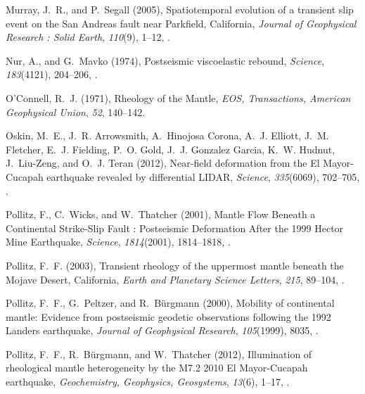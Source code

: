 \documentclass[draft,linenumbers]{AGUJournal}
\begin{document}
\begin{thebibliography}{52}
Murray, J.~R., and P.~Segall (2005), {Spatiotemporal evolution of a transient
  slip event on the San Andreas fault near Parkfield, California},
  \textit{Journal of Geophysical Research : Solid Earth}, \textit{110}(9),
  1--12, .

Nur, A., and G.~Mavko (1974), {Postseismic viscoelastic rebound},
  \textit{Science}, \textit{183}(4121), 204--206, .

O'Connell, R.~J. (1971), {Rheology of the Mantle}, \textit{EOS, Transactions,
  American Geophysical Union}, \textit{52}, 140--142.

Oskin, M.~E., J.~R. Arrowsmith, A.~{Hinojosa Corona}, A.~J. Elliott, J.~M.
  Fletcher, E.~J. Fielding, P.~O. Gold, J.~J. {Gonzalez Garcia}, K.~W. Hudnut,
  J.~Liu-Zeng, and O.~J. Teran (2012), {Near-field deformation from the El
  Mayor-Cucapah earthquake revealed by differential LIDAR}, \textit{Science},
  \textit{335}(6069), 702--705, .

Pollitz, F., C.~Wicks, and W.~Thatcher (2001), {Mantle Flow Beneath a
  Continental Strike-Slip Fault : Postseismic Deformation After the 1999 Hector
  Mine Earthquake}, \textit{Science}, \textit{1814}(2001), 1814--1818,
  .

Pollitz, F.~F. (2003), {Transient rheology of the uppermost mantle beneath the
  Mojave Desert, California}, \textit{Earth and Planetary Science Letters},
  \textit{215}, 89--104, .

Pollitz, F.~F., G.~Peltzer, and R.~B{\"{u}}rgmann (2000), {Mobility of
  continental mantle: Evidence from postseismic geodetic observations following
  the 1992 Landers earthquake}, \textit{Journal of Geophysical Research},
  \textit{105}(1999), 8035, .

  Pollitz, F.~F., R.~B{\"{u}}rgmann, and W.~Thatcher (2012), {Illumination of
  rheological mantle heterogeneity by the M7.2 2010 El Mayor-Cucapah
  earthquake}, \textit{Geochemistry, Geophysics, Geosystems}, \textit{13}(6),
  1--17, .


\end{thebibliography}
\end{document}
